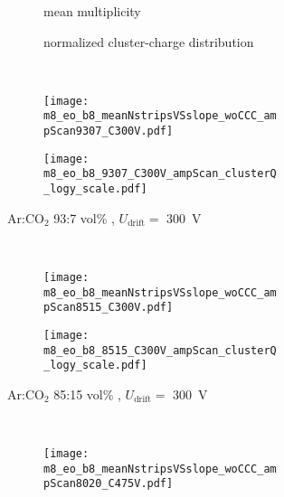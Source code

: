 \documentclass[
twoside,            %
BCOR1.4cm,          %
10pt,               %
headings=normal,    %
headsepline,        %
clearplainpage,		%
final,              %
div=14,
open=right,
bibliography=toc
]{scrreprt}
\begin{document}
\begin{figure}[!h]
	\begin{subfigure}[b]{\textwidth}
		\begin{subfigure}[b]{0.48\textwidth}
			\centering
			mean multiplicity
		\end{subfigure}
		\hfill
		\begin{subfigure}[b]{0.48\textwidth}
			\centering
			normalized cluster-charge distribution
		\end{subfigure}
	\end{subfigure}
	\vspace{2mm}
	\\
	\begin{subfigure}[b]{\textwidth}
		\begin{subfigure}[b]{0.48\textwidth}
			\centering
			\texttt{[image: m8\_eo\_b8\_meanNstripsVSslope\_woCCC\_ampScan9307\_C300V.pdf]}
		\end{subfigure}
		\hfill
		\begin{subfigure}[b]{0.48\textwidth}
			\centering
			\texttt{[image: m8\_eo\_b8\_9307\_C300V\_ampScan\_clusterQ\_logy\_scale.pdf]}
		\end{subfigure}
		\caption{
			Ar:CO$_{2}$ 93:7 vol\% , $U_{\mathrm{drift}} = $ \SI{300}{V}
		}
	\end{subfigure}
	\vspace{2mm}
	\\
	\begin{subfigure}[b]{\textwidth}
		\begin{subfigure}[b]{0.48\textwidth}
			\centering
			\texttt{[image: m8\_eo\_b8\_meanNstripsVSslope\_woCCC\_ampScan8515\_C300V.pdf]}
		\end{subfigure}
		\hfill
		\begin{subfigure}[b]{0.48\textwidth}
			\centering
			\texttt{[image: m8\_eo\_b8\_8515\_C300V\_ampScan\_clusterQ\_logy\_scale.pdf]}
		\end{subfigure}
		\caption{
			Ar:CO$_{2}$ 85:15 vol\% , $U_{\mathrm{drift}} = $ \SI{300}{V}
		}
	\end{subfigure}
	\vspace{2mm}
	\\
	\begin{subfigure}[b]{\textwidth}
		\begin{subfigure}[b]{0.48\textwidth}
			\centering
			\texttt{[image: m8\_eo\_b8\_meanNstripsVSslope\_woCCC\_ampScan8020\_C475V.pdf]}
		\end{subfigure}

\end{subfigure}
\end{figure}
\end{document}
